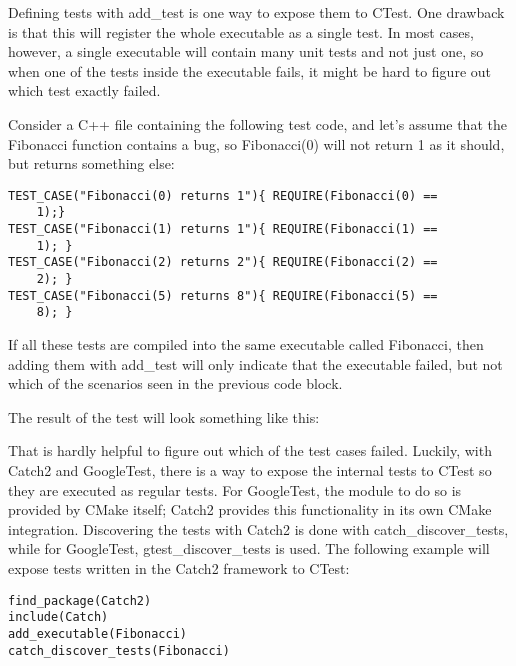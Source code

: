 
Defining tests with add\_test is one way to expose them to CTest. One drawback is that this will register the whole executable as a single test. In most cases, however, a single executable will contain many unit tests and not just one, so when one of the tests inside the executable fails, it might be hard to figure out which test exactly failed.

Consider a C++ file containing the following test code, and let's assume that the Fibonacci function contains a bug, so Fibonacci(0) will not return 1 as it should, but returns something else:

\begin{lstlisting}[style=styleCXX]
TEST_CASE("Fibonacci(0) returns 1"){ REQUIRE(Fibonacci(0) ==
	1);}
TEST_CASE("Fibonacci(1) returns 1"){ REQUIRE(Fibonacci(1) ==
	1); }
TEST_CASE("Fibonacci(2) returns 2"){ REQUIRE(Fibonacci(2) ==
	2); }
TEST_CASE("Fibonacci(5) returns 8"){ REQUIRE(Fibonacci(5) ==
	8); }
\end{lstlisting}

If all these tests are compiled into the same executable called Fibonacci, then adding them with add\_test will only indicate that the executable failed, but not which of the scenarios seen in the previous code block.

The result of the test will look something like this:


That is hardly helpful to figure out which of the test cases failed. Luckily, with Catch2 and GoogleTest, there is a way to expose the internal tests to CTest so they are executed as regular tests. For GoogleTest, the module to do so is provided by CMake itself; Catch2 provides this functionality in its own CMake integration. Discovering the tests with Catch2 is done with catch\_discover\_tests, while for GoogleTest, gtest\_discover\_tests is used. The following example will expose tests written in the Catch2 framework to CTest:

\begin{lstlisting}[style=styleCMake]
find_package(Catch2)
include(Catch)
add_executable(Fibonacci)
catch_discover_tests(Fibonacci)
\end{lstlisting}

